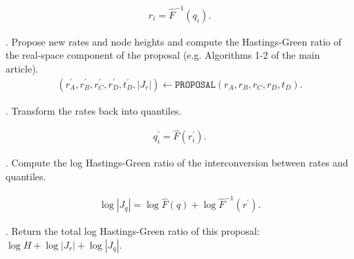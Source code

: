 \documentclass[12pt]{article}
\begin{document}
\begin{align}
	r_i = \hat{F}^{-1}(q_i).
\end{align}


. Propose new rates and node heights and compute the Hastings-Green ratio of the real-space component of the proposal (e.g. Algorithms 1-2 of the main article).    \\


\begin{align}
	(r_A^\prime, r_B^\prime, r_C^\prime, r_D^\prime, t_D^\prime, |J_r|) \leftarrow \texttt{PROPOSAL}(r_A, r_B, r_C, r_D, t_D).
\end{align}


. Transform the rates back into quantiles.

\begin{align}
	q_i^\prime = \hat{F}(r_i^\prime).
\end{align}


. Compute the log Hastings-Green ratio of the interconversion between rates and quantiles.


\begin{align}
	\log|J_q| = \log \hat{F}(q) + \log \hat{F}^{-1}(r^\prime).
\end{align}



. Return the total log Hastings-Green ratio of this proposal: $\log H + \log|J_r| + \log|J_q|$.


\end{document}
